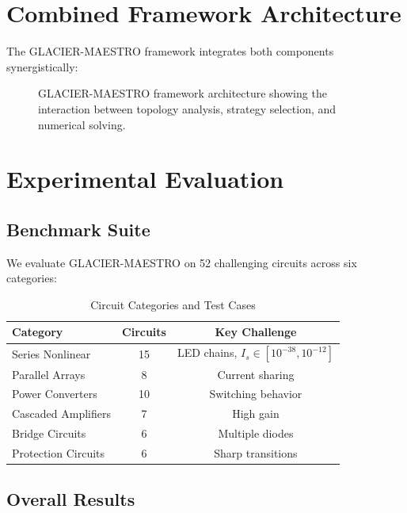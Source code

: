 \documentclass[journal]{IEEEtran}
\begin{document}

\section{Combined Framework Architecture}

The GLACIER-MAESTRO framework integrates both components synergistically:

\begin{figure}[!t]
\centering
\caption{GLACIER-MAESTRO framework architecture showing the interaction between topology analysis, strategy selection, and numerical solving.}
\label{fig:architecture}
\end{figure}


\section{Experimental Evaluation}

\subsection{Benchmark Suite}
We evaluate GLACIER-MAESTRO on 52 challenging circuits across six categories:

\begin{table}[!t]
\caption{Circuit Categories and Test Cases}
\label{tab:categories}
\centering
\begin{tabular}{lcc}
\toprule
Category & Circuits & Key Challenge \\
\midrule
Series Nonlinear & 15 & LED chains, $I_s \in [10^{-38}, 10^{-12}]$ \\
Parallel Arrays & 8 & Current sharing \\
Power Converters & 10 & Switching behavior \\
Cascaded Amplifiers & 7 & High gain \\
Bridge Circuits & 6 & Multiple diodes \\
Protection Circuits & 6 & Sharp transitions \\
\bottomrule
\end{tabular}
\end{table}

\subsection{Overall Results}
\end{document}
